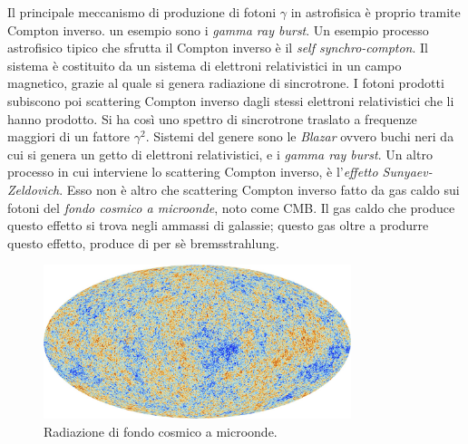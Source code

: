 Il principale meccanismo di produzione di fotoni $\gamma$ in astrofisica è proprio tramite Compton inverso. un esempio sono i \textit{gamma ray burst}. 
Un esempio processo astrofisico tipico che sfrutta il Compton inverso è il \textit{self synchro-compton}. Il sistema è costituito da un sistema di elettroni relativistici in un campo magnetico, grazie al quale si genera radiazione di sincrotrone. I fotoni prodotti subiscono poi scattering Compton inverso dagli stessi elettroni relativistici che li hanno prodotto. Si ha così uno spettro di sincrotrone traslato a frequenze maggiori di un fattore $\gamma^2$. Sistemi del genere sono le \textit{Blazar} ovvero buchi neri da cui si genera un getto di elettroni relativistici, e i \textit{gamma ray burst}.
Un altro processo in cui interviene lo scattering Compton inverso, è l'\textit{effetto Sunyaev-Zeldovich}. Esso non è altro che scattering Compton inverso fatto da gas caldo sui fotoni del \textit{fondo cosmico a microonde}, noto come CMB. Il gas caldo che produce questo effetto si trova negli ammassi di galassie; questo gas oltre a produrre questo effetto, produce di per sè bremsstrahlung.

\begin{figure} 
\begin{center}
\includegraphics[width=0.8\textwidth]{img/CMB}
\caption{Radiazione di fondo cosmico a microonde.}
\end{center}
\end{figure}

